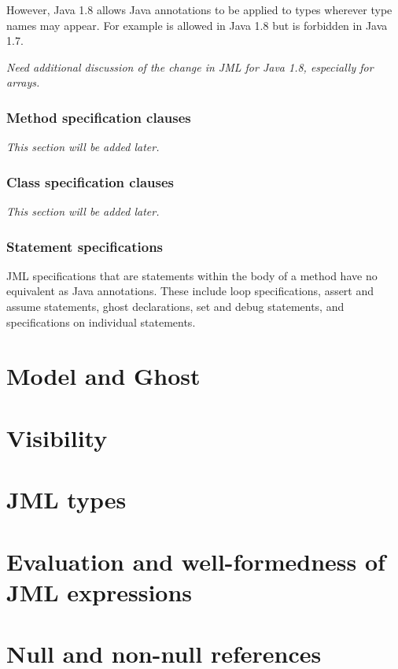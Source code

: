 However, Java 1.8 allows Java annotations to be applied to types wherever type names may appear. For example 
is allowed in Java 1.8 but is forbidden in Java 1.7. 

\textit{Need additional discussion of the change in JML for Java 1.8, especially for arrays.} %

\subsubsection{Method specification clauses}
\textit{This section will be added later.} %

\subsubsection{Class specification clauses}
\textit{This section will be added later.} %

\subsubsection{Statement specifications}

JML specifications that are statements within the body of a method have no equivalent as Java annotations. These include loop specifications, assert and assume statements, ghost declarations, set and debug statements, and specifications on individual statements.
 

\section{Model and Ghost}

\section{Visibility}

\section{JML types}

\section{Evaluation and well-formedness of JML expressions}

\section{Null and non-null references}

